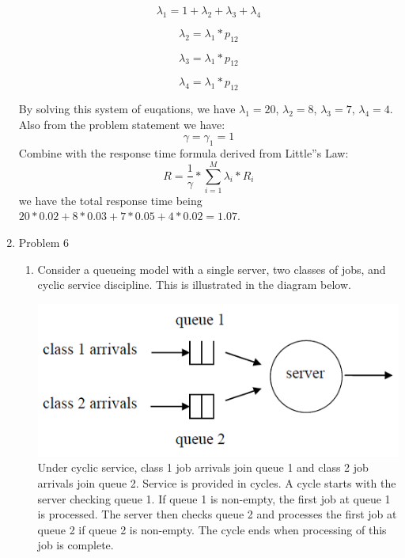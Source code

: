 \documentclass[letterpaper]{article}
\begin{document}
\begin{enumerate}
\begin{equation}
\lambda_1 = 1 + \lambda_2 + \lambda_3 + \lambda_4
\end{equation}

\begin{equation}
\lambda_2 = \lambda_1 * p_{12}
\end{equation}

\begin{equation}
\lambda_3 = \lambda_1 * p_{12}
\end{equation}

\begin{equation}
\lambda_4 = \lambda_1 * p_{12}
\end{equation}

By solving this system of euqations, we have $\lambda_1 = 20$, $\lambda_2 = 8$, $\lambda_3 = 7$, $\lambda_4 = 4$. Also from the problem statement we have:
\begin{equation}
\gamma = \gamma_1 = 1
\end{equation}
Combine with the response time formula derived from Little''s Law:
\begin{equation}
R = \frac{1}{\gamma} * \sum_{i=1}^{M}{\lambda_i * R_i}
\end{equation}
we have the total response time being $20 * 0.02 + 8 * 0.03 + 7 * 0.05 + 4 * 0.02 = 1.07$.
\medskip

\item{Problem 6}

\begin{enumerate}
\item{} Consider a queueing model with a single server, two classes of jobs, and cyclic service discipline. This is illustrated in the diagram below.

\includegraphics{a1q6.png}
Under cyclic service, class 1 job arrivals join queue 1 and class 2 job arrivals join queue 2. Service is provided in cycles. A cycle starts with the server checking queue 1. If queue 1 is non-empty, the first job at queue 1 is processed. The server then checks queue 2 and processes the first job at queue 2 if queue 2 is non-empty. The cycle ends when processing of this job is complete.


\end{enumerate}
\end{enumerate}
\end{document}
